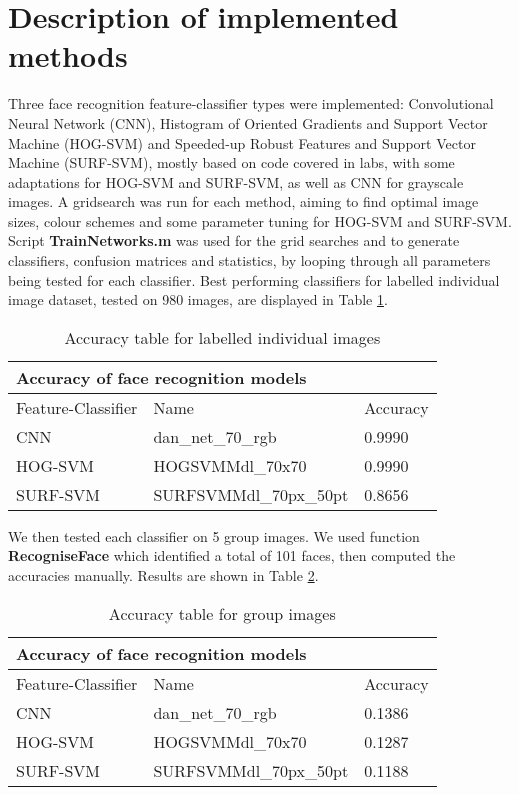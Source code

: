 \section{Description of implemented methods}
\label{DOIM-marker} 
Three face recognition feature-classifier types were implemented: Convolutional Neural Network (CNN), Histogram of Oriented Gradients and Support Vector Machine (HOG-SVM) and Speeded-up Robust Features and Support Vector Machine (SURF-SVM), mostly based on code covered in labs, with some adaptations for HOG-SVM and SURF-SVM, as well as CNN for grayscale images. A gridsearch was run for each method, aiming to find optimal image sizes, colour schemes and some parameter tuning for HOG-SVM and SURF-SVM. Script \textbf{TrainNetworks.m} was used for the grid searches and to generate classifiers, confusion matrices and statistics, by looping through all parameters being tested for each classifier. Best performing classifiers for labelled individual image dataset, tested on 980 images, are displayed in Table \ref{table:acc_table}.
\begin{table}[h]
\centering
\begin{tabular}{|l|l|l|}
\hline
\multicolumn{3}{|l|}{Accuracy of face recognition models} \\ \hline
Feature-Classifier  &  Name & Accuracy \\ \hline
CNN & dan\_net\_70\_rgb & 0.9990 \\ \hline
HOG-SVM & HOGSVMMdl\_70x70 & 0.9990 \\ \hline
SURF-SVM & SURFSVMMdl\_70px\_50pt & 0.8656 \\ \hline
\end{tabular}
\caption{Accuracy table for labelled individual images}
\label{table:acc_table}
\end{table}
We then tested each classifier on 5 group images. We used function \textbf{RecogniseFace} which identified a total of 101 faces, then computed the accuracies manually. Results are shown in Table \ref{table:acc_table_group}.
\begin{table}[h]
\centering
\begin{tabular}{|l|l|l|}
\hline
\multicolumn{3}{|l|}{Accuracy of face recognition models} \\ \hline
Feature-Classifier  &  Name & Accuracy \\ \hline
CNN & dan\_net\_70\_rgb & 0.1386 \\ \hline
HOG-SVM & HOGSVMMdl\_70x70 & 0.1287 \\ \hline
SURF-SVM & SURFSVMMdl\_70px\_50pt & 0.1188 \\ \hline
\end{tabular}
\caption{Accuracy table for group images}
\label{table:acc_table_group}
\end{table}

